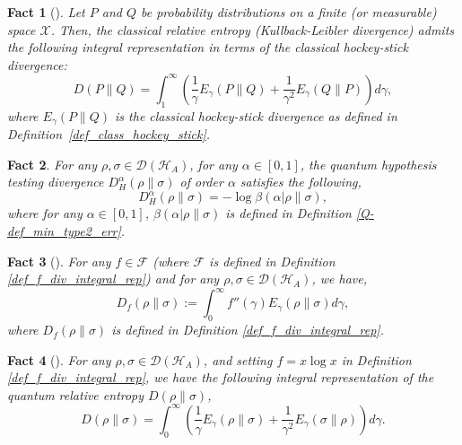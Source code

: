 \documentclass[onecolumn,ldraftcls, 11pt]{IEEEtran}
\newtheorem{fact}{Fact}
\newcommand*{\cH}{\mathcal{H}}
\newcommand*{\cF}{\mathcal{F}}
\newcommand*{\cD}{\mathcal{D}}
\begin{document}
\begin{fact}[\cite{Sason_2016}]\label{fact_classical_KL_div_integral_rep}
Let $P$ and $Q$ be probability distributions on a finite (or measurable) space $\mathcal{X}$. Then, the classical relative entropy (Kullback-Leibler divergence) admits the following integral representation in terms of the classical hockey-stick divergence:
\begin{equation}
    D(P\|Q) = \int_{1}^{\infty} \left( \frac{1}{\gamma} E_{\gamma}(P\|Q) + \frac{1}{\gamma^2} E_{\gamma}(Q\|P) \right) d\gamma,
\end{equation}
where $E_{\gamma}(P\|Q)$ is the classical hockey-stick divergence as defined in Definition~\ref{def_class_hockey_stick}.
\end{fact}

\begin{fact}\label{fact_d_hyp_func}
    For any $\rho,\sigma \in \cD(\cH_A)$, for any $\alpha \in [0,1]$, the quantum hypothesis testing divergence $D^{\alpha}_{H}{(\rho\|\sigma)}$ of order $\alpha$ satisfies the following,
    \begin{equation}
        D^{\alpha}_{H}{(\rho\|\sigma)} = - \log \beta(\alpha|\rho\|\sigma),\label{fact_d_hyp_func_eq}
    \end{equation}
    where for any $\alpha \in [0,1]$, $\beta(\alpha|\rho\|\sigma)$ is defined in Definition \ref{Q-def_min_type2_err}.
\end{fact}

\begin{fact}[\cite{Hirche_2024}]\label{fact_f_div_integral_rep}
    For any $f \in \cF$ (where $\cF$ is defined in Definition \ref{def_f_div_integral_rep}) and for any $\rho,\sigma \in \cD(\cH_A)$, we have,
    \begin{equation}
        D_f(\rho\|\sigma) :=  \int_{0}^{\infty} f''(\gamma) E_{\gamma}(\rho\|\sigma) d\gamma,\label{fact_f_div_integral_rep_eq}
    \end{equation}
    where $D_f(\rho\|\sigma)$ is defined in Definition \ref{def_f_div_integral_rep}.
\end{fact}

\begin{fact}[\cite{Hirche_2024}]\label{fact_KL_div_integral_rep}
    For any $\rho,\sigma \in \cD(\cH_A)$, and setting $f =x\log x$ in Definition \ref{def_f_div_integral_rep}, we have the following integral representation of the quantum relative entropy $D(\rho\|\sigma)$,
    \begin{equation}
        D(\rho\|\sigma) =  \int_{0}^{\infty}\left( \frac{1}{\gamma} E_{\gamma}(\rho\|\sigma) + \frac{1}{\gamma^2} E_{\gamma}(\sigma\|\rho)\right) d\gamma.\label{fact_KL_div_integral_rep_eq}
    \end{equation}
\end{fact}
\end{document}
